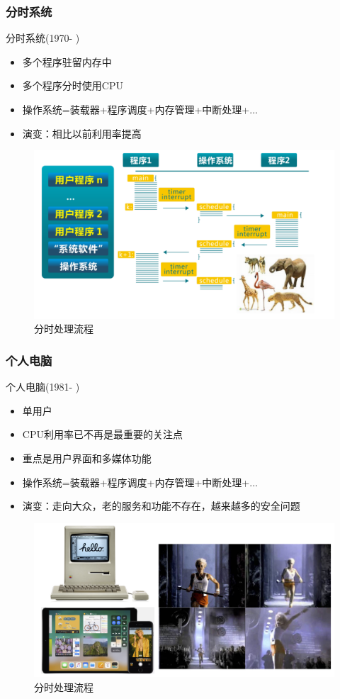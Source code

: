 \documentclass[UTF8]{ctexbeamer}
\begin{document}
\begin{frame}
	
	\frametitle{分时系统}
	
	分时系统(1970- )
	\begin{itemize}
		\item 多个程序驻留内存中
		\item 多个程序分时使用CPU	
		\item 操作系统=装载器+程序调度+内存管理+中断处理+...
		\item 演变：相比以前利用率提高
	\end{itemize}
	
	\begin{figure}
		\centering
		\includegraphics[width=0.8\linewidth]{history-timesharing}
		\caption{分时处理流程}
	\end{figure}
	
\end{frame}


\begin{frame}
	
	\frametitle{个人电脑}
	
	个人电脑(1981- )
	\begin{itemize}
		\item 单用户
		\item CPU利用率已不再是最重要的关注点	
		\item 重点是用户界面和多媒体功能
		\item 操作系统=装载器+程序调度+内存管理+中断处理+...
		\item 演变：走向大众，老的服务和功能不存在，越来越多的安全问题
	\end{itemize}
	
	\begin{figure}
		\centering
		\includegraphics[width=0.8\linewidth]{history-pc}
		\caption{分时处理流程}
	\end{figure}
	
\end{frame}
\end{document}
